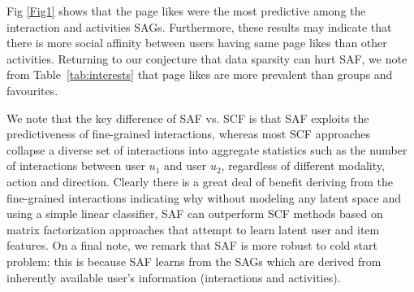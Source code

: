 Fig \ref{Fig1} shows that the page likes were the most predictive among
the interaction and activities SAGs. Furthermore, these results may indicate
that there is more social affinity between users having same page likes
than other activities. Returning to our conjecture that data 
sparsity can hurt SAF, we note from Table~\ref{tab:interests} that page 
likes are more prevalent than groups and favourites. 





We note that the key difference of SAF vs. SCF is
that SAF exploits the predictiveness of fine-grained interactions, whereas most SCF
approaches~\cite{Noel2012NOF,lla,socinf,sr,rrmf,sorec,ste} collapse a diverse set
 of interactions into aggregate statistics such as the number of interactions 
between user $u_1$ and user $u_2$, regardless of different modality, action and direction.
Clearly there is a great deal of benefit deriving from the fine-grained 
interactions indicating why without modeling any latent space and using 
a simple linear classifier, SAF can outperform SCF methods based on matrix
factorization approaches that attempt to learn latent user and item
features. On a final note, we remark that SAF is more robust to cold start 
problem: this is because SAF learns from the SAGs which are derived from 
inherently available user's information (interactions and activities).


